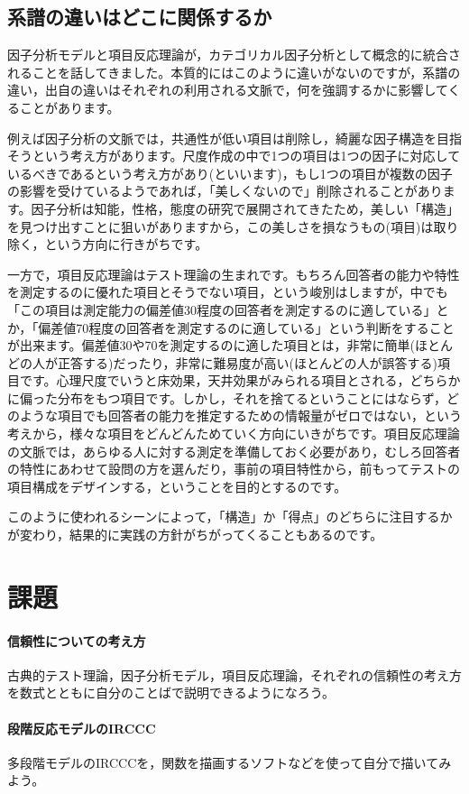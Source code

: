 \documentclass{ltjsbook}
\begin{document}
\subsection{系譜の違いはどこに関係するか}

因子分析モデルと項目反応理論が，カテゴリカル因子分析として概念的に統合されることを話してきました。本質的にはこのように違いがないのですが，系譜の違い，出自の違いはそれぞれの利用される文脈で，何を強調するかに影響してくることがあります。

例えば因子分析の文脈では，共通性が低い項目は削除し，綺麗な因子構造を目指そうという考え方があります。尺度作成の中で1つの項目は1つの因子に対応しているべきであるという考え方があり(といいます)，もし1つの項目が複数の因子の影響を受けているようであれば，「美しくないので」削除されることがあります。因子分析は知能，性格，態度の研究で展開されてきたため，美しい「構造」を見つけ出すことに狙いがありますから，この美しさを損なうもの(項目)は取り除く，という方向に行きがちです。

一方で，項目反応理論はテスト理論の生まれです。もちろん回答者の能力や特性を測定するのに優れた項目とそうでない項目，という峻別はしますが，中でも「この項目は測定能力の偏差値30程度の回答者を測定するのに適している」とか，「偏差値70程度の回答者を測定するのに適している」という判断をすることが出来ます。偏差値30や70を測定するのに適した項目とは，非常に簡単(ほとんどの人が正答する)だったり，非常に難易度が高い(ほとんどの人が誤答する)項目です。心理尺度でいうと床効果，天井効果がみられる項目とされる，どちらかに偏った分布をもつ項目です。しかし，それを捨てるということにはならず，どのような項目でも回答者の能力を推定するための情報量がゼロではない，という考えから，様々な項目をどんどんためていく方向にいきがちです。項目反応理論の文脈では，あらゆる人に対する測定を準備しておく必要があり，むしろ回答者の特性にあわせて設問の方を選んだり，事前の項目特性から，前もってテストの項目構成をデザインする，ということを目的とするのです。

このように使われるシーンによって，「構造」か「得点」のどちらに注目するかが変わり，結果的に実践の方針がちがってくることもあるのです。

\section{課題}
\paragraph{信頼性についての考え方} 古典的テスト理論，因子分析モデル，項目反応理論，それぞれの信頼性の考え方を数式とともに自分のことばで説明できるようになろう。
\paragraph{段階反応モデルのIRCCC} 多段階モデルのIRCCCを，関数を描画するソフトなどを使って自分で描いてみよう。
\end{document}
